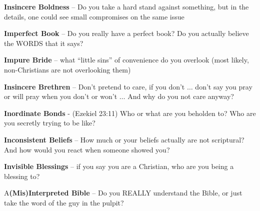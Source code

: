 \begin{compactenum}[I.]
	\item  \textbf{Insincere Boldness} -- Do you take a hard stand against something, but in  the details, one could see small compromises on the same issue
	\item \textbf{Imperfect Book} -- Do you really have a perfect book? Do you actually believe  the WORDS that it says?
	\item \textbf{Impure Bride} -- what ``little sins'' of convenience do you overlook (most likely, non-Christians are not overlooking them)
	\item \textbf{Insincere Brethren} -- Don't pretend to care, if you don't $\hdots$  don't say you pray or will pray when you don't or won't $\hdots$ And why do you not care  anyway?
	\item \textbf{Inordinate Bonds} - (Ezekiel 23:11) Who or what are you beholden to? Who are you secretly trying to be like?
	\item \textbf{Inconsistent Beliefs} -- How much or your beliefs actually are not scriptural? And how would you react when someone showed you?
	\item \textbf{Invisible Blessings} -- if you say you are a Christian, who are you being a blessing to?
	\item A\textbf{(Mis)Interpreted Bible} -- Do  you REALLY understand the Bible, or just take the word of the guy in the pulpit?
\end{compactenum}


